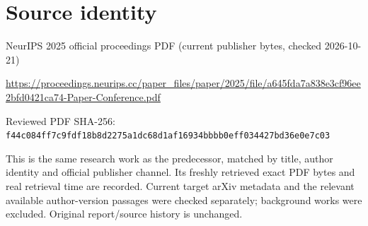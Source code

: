 \documentclass[11pt]{article}
\begin{document}
\section*{Source identity}

NeurIPS 2025 official proceedings PDF (current publisher bytes, checked 2026-10-21)

\url{https://proceedings.neurips.cc/paper_files/paper/2025/file/a645fda7a838e3cf96ee2bfd0421ca74-Paper-Conference.pdf}

Reviewed PDF SHA-256: \nolinkurl{f44c084ff7c9fdf18b8d2275a1dc68d1af16934bbbb0eff034427bd36e0e7c03}

This is the same research work as the predecessor, matched by title, author identity and official publisher channel. Its freshly retrieved exact PDF bytes and real retrieval time are recorded. Current target arXiv metadata and the relevant available author-version passages were checked separately; background works were excluded. Original report/source history is unchanged.
\end{document}
